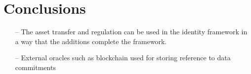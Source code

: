 \section{Conclusions}
\label{apps:conclusions}

	\begin{itemize}
    \item[--] The asset transfer and regulation can be used in the identity framework in a way that the additions complete the framework.
    \item[--] External oracles such as blockchain used for storing reference to data commitments
	\end{itemize}




